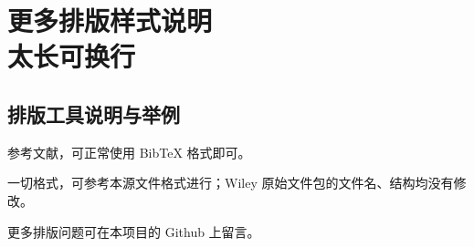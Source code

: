 \documentclass{WileySev}
\begin{document}





\part[更多排版样式说明]
{更多排版样式说明\\ 太长可换行}

\chapter[排版工具说明与举例]
{排版工具说明与举例}

参考文献，可正常使用 BibTeX 格式即可。

一切格式，可参考本源文件格式进行；Wiley 原始文件包的文件名、结构均没有修改。

更多排版问题可在本项目的 Github 上留言。


\end{document}
